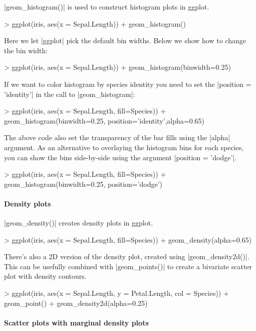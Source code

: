 |geom_histogram()| is used to construct histogram plots in ggplot.
%
\begin{R}
> ggplot(iris, aes(x = Sepal.Length)) + geom_histogram()
\end{R}
%
Here we let |ggplot| pick the default bin widths.  Below we show how to change the bin width:
%
\begin{R}
> ggplot(iris, aes(x = Sepal.Length)) + geom_histogram(binwidth=0.25)
\end{R}
If we want to color histogram by species identity you need to set the |position = 'identity'| in the call to |geom_histogram|:
\begin{R}
> ggplot(iris, aes(x = Sepal.Length, fill=Species)) + 
        geom_histogram(binwidth=0.25, position='identity',alpha=0.65)
\end{R}
The above code also set the transparency of the bar fills using the |alpha| argument.  As an alternative to overlaying the histogram bins for each species, you can show the bins side-by-side using the argument |position = 'dodge'|.
\begin{R}
> ggplot(iris, aes(x = Sepal.Length, fill=Species)) + 
        geom_histogram(binwidth=0.25, position='dodge')
\end{R}

\paragraph{Density plots}

|geom_density()| creates density plots in ggplot.
%
\begin{R}
> ggplot(iris, aes(x = Sepal.Length, fill=Species)) + 
        geom_density(alpha=0.65)
\end{R}
%
There's also a 2D version of the density plot, created using |geom_density2d()|.  This can be usefully combined with |geom_points()| to create a bivariate scatter plot with density contours.
%
\begin{R}
> ggplot(iris, aes(x = Sepal.Length, y = Petal.Length, col = Species)) + 
    geom_point() + geom_density2d(alpha=0.25)
\end{R}

\paragraph{Scatter plots with marginal density plots}

